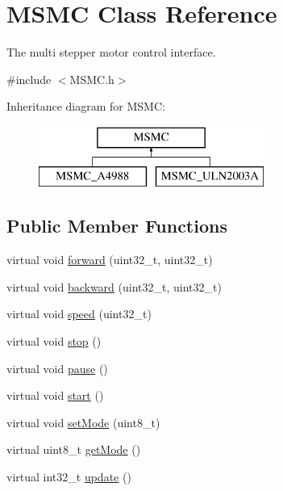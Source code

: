 \hypertarget{class_m_s_m_c}{\section{M\+S\+M\+C Class Reference}
\label{class_m_s_m_c}
}


The multi stepper motor control interface.  




{\ttfamily \#include $<$M\+S\+M\+C.\+h$>$}

Inheritance diagram for M\+S\+M\+C\+:\begin{figure}[H]
\begin{center}
\leavevmode
\includegraphics[height=2.000000cm]{class_m_s_m_c}
\end{center}
\end{figure}
\subsection*{Public Member Functions}
\begin{DoxyCompactItemize}
\item 
virtual void \hyperlink{class_m_s_m_c_a62615946a227d18ea3fc2f1329688d1f}{forward} (uint32\+\_\+t, uint32\+\_\+t)
\item 
virtual void \hyperlink{class_m_s_m_c_a389bfe7f7d05083cb4e95d73128c1c87}{backward} (uint32\+\_\+t, uint32\+\_\+t)
\item 
virtual void \hyperlink{class_m_s_m_c_a065e48c8e8f3b513bf6694e8eb1b28d5}{speed} (uint32\+\_\+t)
\item 
virtual void \hyperlink{class_m_s_m_c_a0b44d0a659550ba754bf9212294ba6d5}{stop} ()
\item 
virtual void \hyperlink{class_m_s_m_c_a9c45f1547467b43209c7a271604e7c85}{pause} ()
\item 
virtual void \hyperlink{class_m_s_m_c_a89abc0ac07d7010ba32d68840da1f822}{start} ()
\item 
virtual void \hyperlink{class_m_s_m_c_a85bd4abf542aecdf24bb90b9ea2a47e9}{set\+Mode} (uint8\+\_\+t)
\item 
virtual uint8\+\_\+t \hyperlink{class_m_s_m_c_a5a1c4ee3498360946cc8e8d39436d0e3}{get\+Mode} ()
\item 
virtual int32\+\_\+t \hyperlink{class_m_s_m_c_a44ca6bc355a269543606dd4eeb7ed06e}{update} ()
\end{DoxyCompactItemize}


